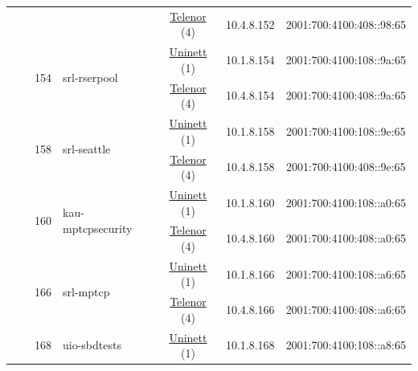 \begin{small}
\begin{center}
\begin{longtable}{|c|c|c|c|c|c|c|c|}
  &  &  &  & \multicolumn{2}{|c|}{\tiny{\href{https://www.telenor.no}{Telenor} (4)}} & \tiny{10.4.8.152} & \tiny{2001:700:4100:408::98:65} \\* \cline{3-3}\cline{4-4}\cline{5-5}\cline{6-6}\cline{7-7}\cline{8-8}
  &  & \multirow{2}{*}{\tiny{154}} & \multicolumn{1}{|l|}{\multirow{2}{*}{\tiny{srl-rserpool}}} & \multicolumn{2}{|c|}{\tiny{\href{https://www.uninett.no}{Uninett} (1)}} & \tiny{10.1.8.154} & \tiny{2001:700:4100:108::9a:65} \\* \cline{5-5}\cline{6-6}\cline{7-7}\cline{8-8}
  &  &  &  & \multicolumn{2}{|c|}{\tiny{\href{https://www.telenor.no}{Telenor} (4)}} & \tiny{10.4.8.154} & \tiny{2001:700:4100:408::9a:65} \\* \cline{3-3}\cline{4-4}\cline{5-5}\cline{6-6}\cline{7-7}\cline{8-8}
  &  & \multirow{2}{*}{\tiny{158}} & \multicolumn{1}{|l|}{\multirow{2}{*}{\tiny{srl-seattle}}} & \multicolumn{2}{|c|}{\tiny{\href{https://www.uninett.no}{Uninett} (1)}} & \tiny{10.1.8.158} & \tiny{2001:700:4100:108::9e:65} \\* \cline{5-5}\cline{6-6}\cline{7-7}\cline{8-8}
  &  &  &  & \multicolumn{2}{|c|}{\tiny{\href{https://www.telenor.no}{Telenor} (4)}} & \tiny{10.4.8.158} & \tiny{2001:700:4100:408::9e:65} \\* \cline{3-3}\cline{4-4}\cline{5-5}\cline{6-6}\cline{7-7}\cline{8-8}
  &  & \multirow{2}{*}{\tiny{160}} & \multicolumn{1}{|l|}{\multirow{2}{*}{\tiny{kau-mptcpsecurity}}} & \multicolumn{2}{|c|}{\tiny{\href{https://www.uninett.no}{Uninett} (1)}} & \tiny{10.1.8.160} & \tiny{2001:700:4100:108::a0:65} \\* \cline{5-5}\cline{6-6}\cline{7-7}\cline{8-8}
  &  &  &  & \multicolumn{2}{|c|}{\tiny{\href{https://www.telenor.no}{Telenor} (4)}} & \tiny{10.4.8.160} & \tiny{2001:700:4100:408::a0:65} \\* \cline{3-3}\cline{4-4}\cline{5-5}\cline{6-6}\cline{7-7}\cline{8-8}
  &  & \multirow{2}{*}{\tiny{166}} & \multicolumn{1}{|l|}{\multirow{2}{*}{\tiny{srl-mptcp}}} & \multicolumn{2}{|c|}{\tiny{\href{https://www.uninett.no}{Uninett} (1)}} & \tiny{10.1.8.166} & \tiny{2001:700:4100:108::a6:65} \\* \cline{5-5}\cline{6-6}\cline{7-7}\cline{8-8}
  &  &  &  & \multicolumn{2}{|c|}{\tiny{\href{https://www.telenor.no}{Telenor} (4)}} & \tiny{10.4.8.166} & \tiny{2001:700:4100:408::a6:65} \\* \cline{3-3}\cline{4-4}\cline{5-5}\cline{6-6}\cline{7-7}\cline{8-8}
  &  & \multirow{2}{*}{\tiny{168}} & \multicolumn{1}{|l|}{\multirow{2}{*}{\tiny{uio-sbdtests}}} & \multicolumn{2}{|c|}{\tiny{\href{https://www.uninett.no}{Uninett} (1)}} & \tiny{10.1.8.168} & \tiny{2001:700:4100:108::a8:65} \\* \cline{5-5}\cline{6-6}\cline{7-7}\cline{8-8}

\end{longtable}
\end{center}
\end{small}
